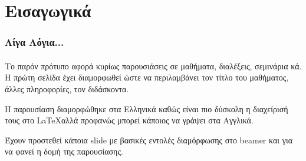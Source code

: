\section{Εισαγωγικά}
 

\begin{frame}\frametitle{Λίγα Λόγια...}\framesubtitle{}
Το παρόν πρότυπο αφορά κυρίως παρουσιάσεις σε μαθήματα, διαλέξεις, σεμινάρια κά.
Η πρώτη σελίδα έχει διαμορφωθεί ώστε να περιλαμβάνει τον τίτλο του μαθήματος, άλλες πληροφορίες, τον διδάσκοντα. 

Η παρουσίαση διαμορφώθηκε στα Ελληνικά καθώς είναι πιο δύσκολη η διαχείρισή τους στο \LaTeX  αλλά προφανώς μπορεί κάποιος να γράψει στα Αγγλικά. 

Έχουν προστεθεί κάποια slide με βασικές εντολές διαμόρφωσης στο beamer και για να φανεί η δομή της παρουσίασης.

\end{frame}
